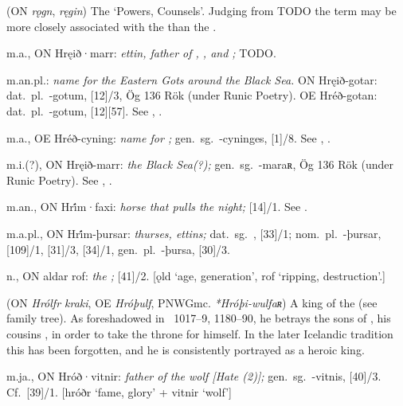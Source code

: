 \begin{itemize}
 (ON \emph{rǫgn}, \emph{ręgin})
  The ‘Powers, Counsels’.  Judging from  TODO the term may be more closely associated with the  than the .

 m.a., ON Hręið·marr:
  \emph{ettin, father of , , and ;}  TODO.

 m.an.pl.:
  \emph{name for the Eastern Gots around the Black Sea.}
  ON Hręið-gotar: dat.~pl.~-gotum, [12]/3, Ög 136 Rök (under Runic Poetry).
  OE Hréð-gotan: dat.~pl.~-gotum, [12][57].
  See , .

 m.a., OE Hréð-cyning:
  \emph{name for ;} gen.~sg.~-cyninges, [1]/8.
  See , .

 m.i.(?), ON Hręið-marr:
  \emph{the Black Sea(?);} gen.~sg.~-maraʀ, Ög 136 Rök (under Runic Poetry).
  See , .

 m.an., ON Hri̇́m·faxi:
  \emph{horse that pulls the night;} [14]/1.  See .

 m.a.pl., ON Hri̇́m-þursar:
  \emph{thurses, ettins;} dat.~sg.~, [33]/1; nom.~pl.~-þursar, [109]/1, [31]/3, [34]/1, gen.~pl.~-þursa, [30]/3.

 n., ON aldar rof:
  \emph{the ;} [41]/2.
  [ǫld ‘age, generation’, rof ‘ripping, destruction’.]

 (ON \emph{Hrólfr kraki}, OE \emph{Hróþulf}, PNWGmc. \emph{*Hróþi-wulfaʀ})
  A king of the  (see family tree). As foreshadowed in \Beowulf\ 1017--9, 1180--90, he betrays the sons of , his cousins , in order to take the throne for himself. In the later Icelandic tradition this has been forgotten, and he is consistently portrayed as a heroic king.

 m.ja., ON Hróð·vitnir:
  \emph{father of the wolf [Hate (2)];} gen.~sg.~-vitnis, [40]/3.  Cf.~[39]/1.
  [hróðr ‘fame, glory’ + vitnir ‘wolf’]


\end{itemize}
